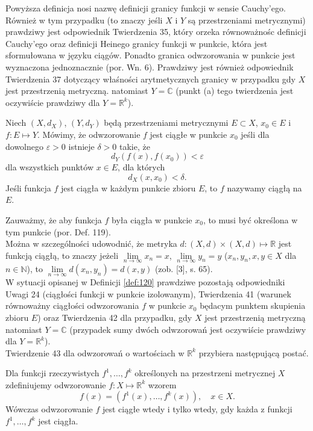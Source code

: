 \documentclass[leqno]{article}
\begin{document}
\begin{justify}
Powyższa definicja nosi nazwę definicji granicy funkcji w sensie Cauchy'ego.
Również w tym przypadku (to znaczy jeśli $X$ i $Y$ są przestrzeniami metrycznymi)
prawdziwy jest odpowiednik Twierdzenia 35, który orzeka równoważnośc definicji Cauchy'ego oraz definicji Heinego granicy funkcji w punkcie, która jest sformułowana w języku ciągów.
Ponadto granica odwzorowania w punkcie jest wyznaczona jednoznacznie (por. Wn. 6). 
Prawdziwy jest również odpowiednik Twierdzenia 37 dotyczący właśności arytmetycznych granicy w przypadku gdy $X$ jest przestrzenią metryczną. natomiast $Y = \mathbb{C}$ (punkt (a) tego twierdzenia jest oczywiście prawdziwy dla $Y = \mathbb{R}^k$).

\begin{defn}
    Niech $(X, d_X)$, $(Y, d_Y)$ będą przestrzeniami metrycznymi $E \subset X$, $x_0 \in E$ i $f : E \mapsto Y$. Mówimy, że odwzorowanie $f$ jest ciągłe w punkcie $x_0$ jeśli dla dowolnego $\varepsilon > 0$ istnieje $\delta > 0$ takie, że
    \[
        d_Y(f(x), f(x_0)) < \varepsilon
    \]
    dla wszystkich punktów $x \in E$, dla których
    \[
        d_X(x, x_0) < \delta.
    \]
    Jeśli funkcja $f$ jest ciągła w każdym punkcie zbioru $E$, to $f$ nazywamy ciągłą na $E$.
\end{defn}

Zauważmy, że aby funkcja $f$ była ciągła w punkcie $x_0$, to musi być określona w tym punkcie (por. Def. 119). \\
Można w szczególności udowodnić, że metryka $d : (X, d) \times (X, d) \mapsto \mathbb{R}$ jest funkcją ciągłą, to znaczy jeżeli $\lim\limits_{n \to \infty}x_n = x$, $\lim\limits_{n \to \infty}y_n = y$ ($x_n, y_n, x, y \in X$ dla $n \in \mathbb{N}$), to $\lim\limits_{n \to \infty}d(x_n, y_n) = d(x, y)$ (zob. [3], s. 65). \\
W sytuacji opisanej w Definicji \ref{def:120} prawdziwe pozostają odpowiedniki Uwagi 24 (ciągłości funkcji w punkcie izolowanym), Twierdzenia 41 (warunek równoważny ciągłości odwzorowania $f$ w punkcie $x_0$ będacym punktem skupienia zbioru $E$) oraz Twierdzenia 42 dla przypadku, gdy $X$ jest przestrzenią metryczną natomiast $Y = \mathbb{C}$ (przypadek sumy dwóch odwzorowań jest oczywiście prawdziwy dla $Y = \mathbb{R}^k$). \\
Twierdzenie 43 dla odwzorowań o wartościach w $\mathbb{R}^k$ przybiera następującą postać.

\begin{theorem}
{
    Dla funkcji rzeczywistych $f^1, \ldots, f^k$ określonych na przestrzeni metrycznej $X$ zdefiniujemy odwzorowanie $f : X \mapsto \mathbb{R}^k$ wzorem 
    \[
        f(x) = (f^1(x), \ldots, f^k(x)), \quad x \in X.
    \]
    Wówczas odwzorowanie $f$ jest ciągłe wtedy i tylko wtedy, gdy każda z funkcji $f^1, \ldots, f^k$ jest ciągła.
}
\end{theorem}


\end{justify}
\end{document}
